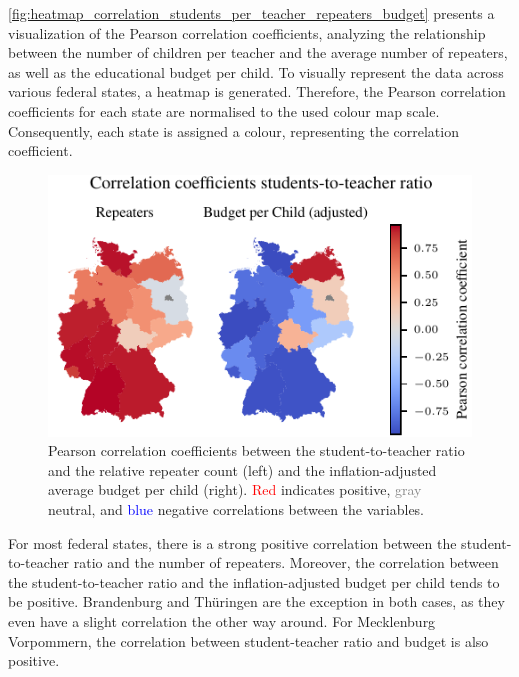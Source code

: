 \autoref{fig:heatmap_correlation_students_per_teacher_repeaters_budget} presents a visualization of the Pearson correlation coefficients, analyzing the relationship between the number of children per teacher and the average number of repeaters, as well as the educational budget per child. To visually represent the data across various federal states, a heatmap is generated. Therefore, the Pearson correlation coefficients for each state are normalised to the used colour map scale. Consequently, each state is assigned a colour, representing the correlation coefficient.

\begin{figure}[ht]
    \centering
    \includegraphics{fig/fig_heatmap_correlation_students_per_teacher_repeaters_budget.pdf}
    \caption{Pearson correlation coefficients between the student-to-teacher ratio and the relative repeater count (left) and the inflation-adjusted average budget per child (right). \textcolor{red}{Red} indicates positive, \textcolor{gray}{gray} neutral, and \textcolor{blue}{blue} negative correlations between the variables.}
    \label{fig:heatmap_correlation_students_per_teacher_repeaters_budget}
\end{figure}

For most federal states, there is a strong positive correlation between the student-to-teacher ratio and the number of repeaters. Moreover, the correlation between the student-to-teacher ratio and the inflation-adjusted budget per child tends to be positive. Brandenburg and Thüringen are the exception in both cases, as they even have a slight correlation the other way around. For Mecklenburg Vorpommern, the correlation between student-teacher ratio and budget is also positive.

